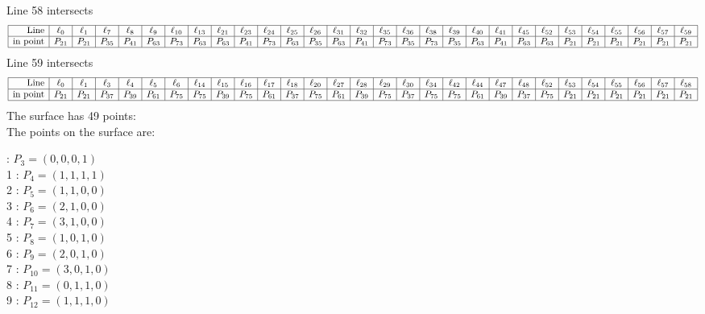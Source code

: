 \documentclass{article}
\begin{document}
{$$$$
Line 58 intersects 
$$
\begin{array}{|r*{28}{|c}|}
\hline
\mbox{Line}  & \ell_{0} & \ell_{1} & \ell_{7} & \ell_{8} & \ell_{9} & \ell_{10} & \ell_{13} & \ell_{21} & \ell_{23} & \ell_{24} & \ell_{25} & \ell_{26} & \ell_{31} & \ell_{32} & \ell_{35} & \ell_{36} & \ell_{38} & \ell_{39} & \ell_{40} & \ell_{41} & \ell_{45} & \ell_{52} & \ell_{53} & \ell_{54} & \ell_{55} & \ell_{56} & \ell_{57} & \ell_{59}\\
\hline
\mbox{in point}  & P_{21} & P_{21} & P_{35} & P_{41} & P_{63} & P_{73} & P_{63} & P_{63} & P_{41} & P_{73} & P_{63} & P_{35} & P_{63} & P_{41} & P_{73} & P_{35} & P_{73} & P_{35} & P_{63} & P_{41} & P_{63} & P_{63} & P_{21} & P_{21} & P_{21} & P_{21} & P_{21} & P_{21}\\
\hline
\end{array}
$$
Line 59 intersects 
$$
\begin{array}{|r*{28}{|c}|}
\hline
\mbox{Line}  & \ell_{0} & \ell_{1} & \ell_{3} & \ell_{4} & \ell_{5} & \ell_{6} & \ell_{14} & \ell_{15} & \ell_{16} & \ell_{17} & \ell_{18} & \ell_{20} & \ell_{27} & \ell_{28} & \ell_{29} & \ell_{30} & \ell_{34} & \ell_{42} & \ell_{44} & \ell_{47} & \ell_{48} & \ell_{52} & \ell_{53} & \ell_{54} & \ell_{55} & \ell_{56} & \ell_{57} & \ell_{58}\\
\hline
\mbox{in point}  & P_{21} & P_{21} & P_{37} & P_{39} & P_{61} & P_{75} & P_{75} & P_{39} & P_{75} & P_{61} & P_{37} & P_{75} & P_{61} & P_{39} & P_{75} & P_{37} & P_{75} & P_{75} & P_{61} & P_{39} & P_{37} & P_{75} & P_{21} & P_{21} & P_{21} & P_{21} & P_{21} & P_{21}\\
\hline
\end{array}
$$
The surface has 49 points:\\
The points on the surface are:\\
\begin{multicols}{3}
 : $P_{3}=( 0, 0, 0, 1 )$\\
1 : $P_{4}=( 1, 1, 1, 1 )$\\
2 : $P_{5}=( 1, 1, 0, 0 )$\\
3 : $P_{6}=( 2, 1, 0, 0 )$\\
4 : $P_{7}=( 3, 1, 0, 0 )$\\
5 : $P_{8}=( 1, 0, 1, 0 )$\\
6 : $P_{9}=( 2, 0, 1, 0 )$\\
7 : $P_{10}=( 3, 0, 1, 0 )$\\
8 : $P_{11}=( 0, 1, 1, 0 )$\\
9 : $P_{12}=( 1, 1, 1, 0 )$\\

\end{multicols}}
\end{document}
